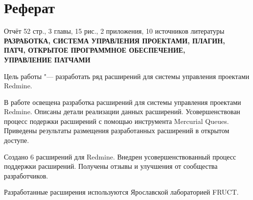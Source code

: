 \newpage

\thispagestyle{empty}

\section*{Реферат}

\noindent
Отчёт 52 стр., 3 главы, 15 рис., 2 приложения, 10 источников литературы \\
\textbf{
РАЗРАБОТКА, СИСТЕМА УПРАВЛЕНИЯ ПРОЕКТАМИ, ПЛАГИН, \\ 
ПАТЧ, ОТКРЫТОЕ ПРОГРАММНОЕ ОБЕСПЕЧЕНИЕ, \\
УПРАВЛЕНИЕ ПАТЧАМИ}

Цель работы "--- разработать ряд расширений для системы управления проектами
Redmine.

В работе освещена разработка расширений для системы управления проектами
Redmine. Описаны детали реализации данных расширений. Усовершенствован процесс
подержки расширений с помощью инструмента Mercurial Queues. Приведены
результаты размещения разработанных расширений в открытом доступе.

Создано 6 расширений для Redmine. Внедрен усовершенствованный процесс поддержки
расширений. Получены отзывы и улучшения от сообщества разработчиков.

Разработанные расширения используются Ярославской лабораторией FRUCT.


